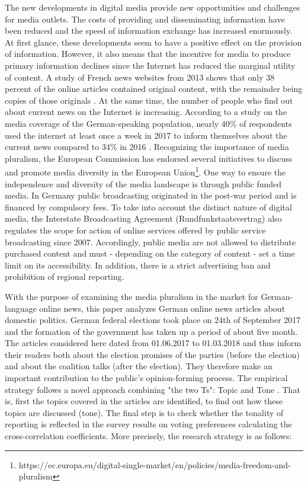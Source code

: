 \documentclass[12pt,a4paper,notitlepage]{article}
\begin{document}
The new developments in digital media provide new opportunities and challenges for media outlets. The costs of providing and disseminating information have been reduced and the speed of information exchange has increased enormously. At first glance, these developments seem to have a positive effect on the provision of information. However, it also means that the incentive for media to produce primary information declines since the Internet has reduced the marginal utility of content. A study of French news websites from 2013 shows that only 38 percent of the online articles contained original content, with the remainder being copies of those originals \citep{cage_information_2017}. At the same time, the number of people who find out about current news on the Internet is increasing. According to a study on the media coverage of the German-speaking population, nearly 40\% of respondents used the internet at least once a week in 2017 to inform themselves about the current news compared to 34\% in 2016 \citep{vuma_arbeitsgemeinschaft_verbrauchs-_und_medienanalyse_verbrauchs-_2017}. Recognizing the importance of media pluralism, the European Commission has endorsed several initiatives to discuss and promote media diversity in the European Union\footnote{https://ec.europa.eu/digital-single-market/en/policies/media-freedom-and-pluralism}. One way to ensure the independence and diversity of the media landscape is through public funded media. In Germany public broadcasting originated in the post-war period and is financed by compulsory fees. To take into account the distinct nature of digital media, the Interstate Broadcasting Agreement (Rundfunkstaatsvertrag) also regulates the scope for action of online services offered by public service broadcasting since 2007. Accordingly, public media are not allowed to distribute purchased content and must - depending on the category of content - set a time limit on its accessibility. In addition, there is a strict advertising ban and prohibition of regional reporting. 

With the purpose of examining the media pluralism in the market for German-language online news, this paper analyzes German online news articles about domestic politics. German federal elections took place on 24th of September 2017 and the formation of the government has taken up a period of about five month. The articles considered here dated from 01.06.2017 to 01.03.2018 and thus inform their readers both about the election promises of the parties (before the election) and about the coalition talks (after the election). They therefore make an important contribution to the public's opinion-forming process. The empirical strategy follows a novel approach combining "the two Ts": Topic and Tone \citep{hansen_shocking_2016}. That is, first the topics covered in the articles are identified, to find out how these topics are discussed (tone). The final step is to check whether the tonality of reporting is reflected in the survey results on voting preferences calculating the cross-correlation coefficients. More precisely, the research strategy is as follows:
\end{document}
